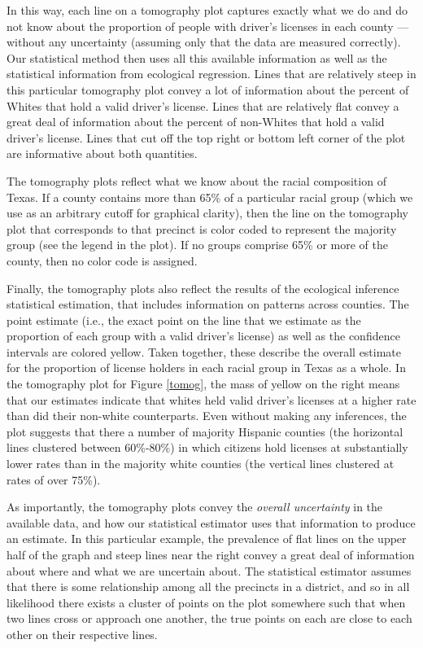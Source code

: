 \documentclass[12pt]{article}
\begin{document}
In this way, each line on a tomography plot captures exactly what we
do and do not know about the proportion of people with driver's licenses in each county ---
without any uncertainty (assuming only that the data are measured
correctly). Our statistical method then uses all this available
information as well as the statistical information from ecological
regression. Lines that are relatively steep in this particular
tomography plot convey a lot of information about the percent of
Whites that hold a valid driver's license.  Lines that are
relatively flat convey a great deal of information about the percent
of non-Whites that hold a valid driver's license.  Lines that cut off
the top right or bottom left corner of the plot are informative about
both quantities.

The tomography plots reflect what we know about the racial composition
of Texas. If a county contains more than 65\% of a
particular racial group (which we use as an arbitrary cutoff for
graphical clarity), then the line on the tomography plot that
corresponds to that precinct is color coded to represent the majority
group (see the legend in the plot). If no groups comprise 65\% or more
of the county, then no color code is assigned.  

Finally, the tomography plots also reflect the results of the
ecological inference statistical estimation, that includes information
on patterns across counties. The point estimate (i.e., the exact
point on the line that we estimate as the proportion of each group with a valid driver's license)
as well as the confidence intervals are colored yellow.  Taken
together, these describe the overall estimate for the proportion of license holders in
each racial group in Texas as a whole. In the tomography plot
for Figure \ref{tomog}, the mass of yellow on the right means that our
estimates indicate that whites held valid driver's licenses at a higher rate than did their
non-white counterparts. Even without making any inferences, the plot suggests that there
a number of majority Hispanic counties (the horizontal lines clustered between 60\%-80\%) 
in which citizens hold licenses at substantially lower
rates than in the majority white counties (the vertical lines clustered at rates of over 75\%). 

As importantly, the tomography plots convey the \emph{overall
  uncertainty} in the available data, and how our statistical
estimator uses that information to produce an estimate.  In this
particular example, the prevalence of flat lines on the upper half of the graph and
steep lines near the right convey a great deal of information about
where and what we are uncertain about.  The statistical estimator
assumes that there is some relationship among all the precincts in a
district, and so in all likelihood there exists a cluster of points on
the plot somewhere such that when two lines cross or approach one
another, the true points on each are close to each other on their
respective lines.  
\end{document}
